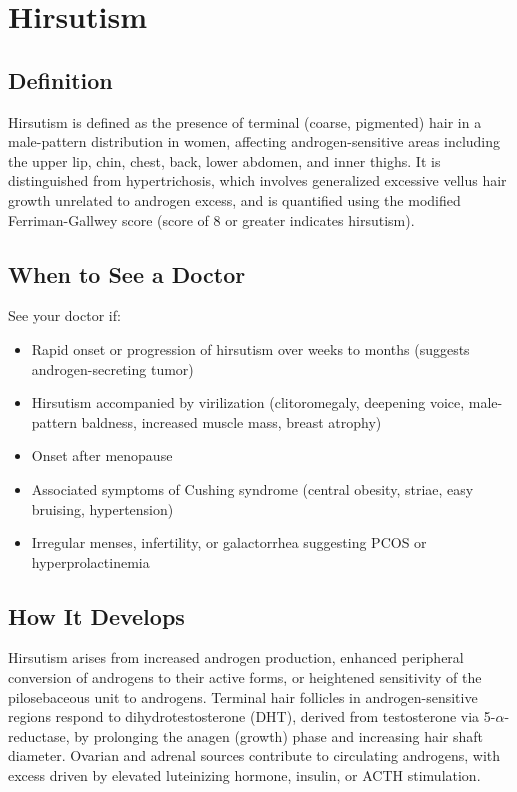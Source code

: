 \chapter{Hirsutism}

\section*{Definition}
Hirsutism is defined as the presence of terminal (coarse, pigmented) hair in a male-pattern distribution in women, affecting androgen-sensitive areas including the upper lip, chin, chest, back, lower abdomen, and inner thighs. It is distinguished from hypertrichosis, which involves generalized excessive vellus hair growth unrelated to androgen excess, and is quantified using the modified Ferriman-Gallwey score (score of 8 or greater indicates hirsutism).

\section*{When to See a Doctor}
See your doctor if:
\begin{itemize}
  \item Rapid onset or progression of hirsutism over weeks to months (suggests androgen-secreting tumor)
  \item Hirsutism accompanied by virilization (clitoromegaly, deepening voice, male-pattern baldness, increased muscle mass, breast atrophy)
  \item Onset after menopause
  \item Associated symptoms of Cushing syndrome (central obesity, striae, easy bruising, hypertension)
  \item Irregular menses, infertility, or galactorrhea suggesting PCOS or hyperprolactinemia
\end{itemize}

\section*{How It Develops}
Hirsutism arises from increased androgen production, enhanced peripheral conversion of androgens to their active forms, or heightened sensitivity of the pilosebaceous unit to androgens. Terminal hair follicles in androgen-sensitive regions respond to dihydrotestosterone (DHT), derived from testosterone via 5-$\alpha$-reductase, by prolonging the anagen (growth) phase and increasing hair shaft diameter. Ovarian and adrenal sources contribute to circulating androgens, with excess driven by elevated luteinizing hormone, insulin, or ACTH stimulation.

